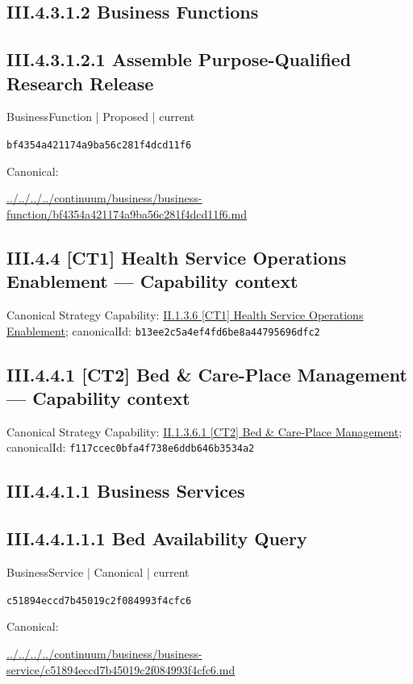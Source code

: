 \documentclass[10pt,a4paper]{article}
\begin{document}
\subsection*{III.4.3.1.2 Business Functions}
\subsection*{III.4.3.1.2.1 Assemble Purpose-Qualified Research Release}
\label{element-bf4354a421174a9ba56c281f4dcd11f6}
{\small BusinessFunction | Proposed | current}\par
\texttt{bf4354a421174a9ba56c281f4dcd11f6}\par
Canonical: \par
{\footnotesize\url{../../../../continuum/business/business-function/bf4354a421174a9ba56c281f4dcd11f6.md}}\par
\subsection*{III.4.4 [CT1] Health Service Operations Enablement — Capability context}
Canonical Strategy Capability: \hyperref[element-b13ee2c5a4ef4fd6be8a44795696dfc2]{II.1.3.6 [CT1] Health Service Operations Enablement}; canonicalId: \texttt{b13ee2c5a4ef4fd6be8a44795696dfc2}\par
\subsection*{III.4.4.1 [CT2] Bed \& Care-Place Management — Capability context}
Canonical Strategy Capability: \hyperref[element-f117ccec0bfa4f738e6ddb646b3534a2]{II.1.3.6.1 [CT2] Bed \& Care-Place Management}; canonicalId: \texttt{f117ccec0bfa4f738e6ddb646b3534a2}\par
\subsection*{III.4.4.1.1 Business Services}
\subsection*{III.4.4.1.1.1 Bed Availability Query}
\label{element-c51894eccd7b45019c2f084993f4cfc6}
{\small BusinessService | Canonical | current}\par
\texttt{c51894eccd7b45019c2f084993f4cfc6}\par
Canonical: \par
{\footnotesize\url{../../../../continuum/business/business-service/c51894eccd7b45019c2f084993f4cfc6.md}}\par
\end{document}
